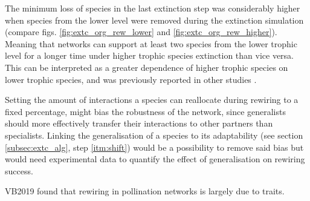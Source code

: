 \documentclass[12pt,a4paper]{article}
\begin{document}

The minimum loss of species in the last extinction step was considerably higher when species from the lower level were removed during the extinction simulation (compare figs. \ref{fig:extc_org_rew_lower} and \ref{fig:extc_org_rew_higher}). 
Meaning that networks can support at least two species from the lower trophic level for a longer time under higher trophic species extinction than vice versa. This can be interpreted as a greater dependence of higher trophic species on lower trophic species, and was previously reported in other studies \parencite{Bascompte2006, Schleuning2016}.


Setting the amount of interactions a species can reallocate during rewiring to a fixed percentage, might bias the robustness of the network, since generalists should more effectively transfer their interactions to other partners than specialists. Linking the generalisation of a species to its adaptability (see section \ref{subsec:extc_alg}, step \ref{itm:shift}) would be a possibility to remove said bias but would need experimental data to quantify the effect of generalisation on rewiring success.

VB2019 found that rewiring in pollination networks is largely due to traits. 


\end{document}
